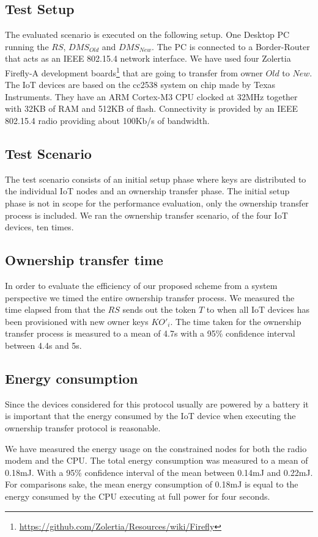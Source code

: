 {\subsection{Test Setup}
The evaluated scenario is executed on the following setup. One Desktop PC running the $RS$, $DMS_{Old}$ and $DMS_{New}$. The PC is connected to a Border-Router that acts as an IEEE 802.15.4 network interface. We have used four Zolertia Firefly-A development boards\footnote{\url{https://github.com/Zolertia/Resources/wiki/Firefly}} that are going to transfer from owner $Old$ to $New$. The IoT devices are based on the cc2538 system on chip made by Texas Instruments\cite{instruments2015cc2538}. They have an ARM Cortex-M3 CPU clocked at 32MHz together with 32KB of RAM and 512KB of flash. Connectivity is provided by an IEEE 802.15.4 radio providing about 100Kb/s of bandwidth. 

\subsection{Test Scenario}
The test scenario consists of an initial setup phase where keys are distributed to the individual IoT nodes and an ownership transfer phase. The initial setup phase is not in scope for the performance evaluation, only the ownership transfer process is included. We ran the ownership transfer scenario, of the four IoT devices, ten times.

\subsection{Ownership transfer time}
In order to evaluate the efficiency of our proposed scheme from a system perspective we timed the entire ownership transfer process. We measured the time elapsed from that the $RS$ sends out the token $T$ to when all IoT devices has been provisioned with new owner keys $KO'_{i}$.
The time taken for the ownership transfer process is measured to a mean of 4.7s with a 95\% confidence interval between 4.4s and 5s.

\subsection{Energy consumption}
Since the devices considered for this protocol usually are powered by a battery it is important that the energy consumed by the IoT device when executing the ownership transfer protocol is reasonable.

We have measured the energy usage on the constrained nodes for both the radio modem and the CPU. The total energy consumption was measured to a mean of 0.18mJ. With a 95\% confidence interval of the mean between 0.14mJ and 0.22mJ. For comparisons sake, the mean energy consumption of 0.18mJ is equal to the energy consumed by the CPU executing at full power for four seconds.

}
